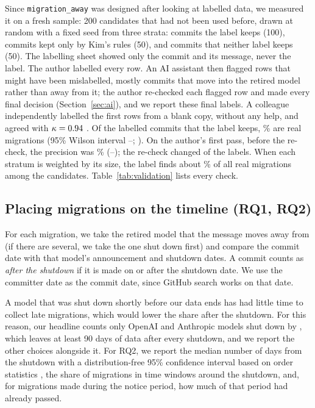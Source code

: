 Since \texttt{migration\_away} was designed after looking at labelled data, we measured it on a fresh sample: 200 candidates that had not been used before, drawn at random with a fixed seed from three strata: commits the label keeps (100), commits kept only by Kim's rules (50), and commits that neither label keeps (50). The labelling sheet showed only the commit and its message, never the label. The author labelled every row. An AI assistant then flagged rows that might have been mislabelled, mostly commits that move into the retired model rather than away from it; the author re-checked each flagged row and made every final decision (Section~\ref{sec:ai}), and we report these final labels. A colleague independently labelled the first \FilterKappaRows{} rows from a blank copy, without any help, and agreed with $\kappa = 0.94$ \citep{cohen1960}. Of the \PrecisionRows{} labelled commits that the label keeps, \Precision\% are real migrations (95\% Wilson interval \PrecisionLow--\PrecisionHigh; \citealp{wilson1927}). On the author's first pass, before the re-check, the precision was \FirstPassPrecision\% (\FirstPassPrecisionLow--\FirstPassPrecisionHigh); the re-check changed \FirstPassChanged{} of the \FirstPassRows{} labels. When each stratum is weighted by its size, the label finds about \Recall\% of all real migrations among the candidates. Table~\ref{tab:validation} lists every check.


\subsection{Placing migrations on the timeline (RQ1, RQ2)}

For each migration, we take the retired model that the message moves away from (if there are several, we take the one shut down first) and compare the commit date with that model's announcement and shutdown dates. A commit counts as \emph{after the shutdown} if it is made on or after the shutdown date. We use the committer date as the commit date, since GitHub search works on that date.

A model that was shut down shortly before our data ends has had little time to collect late migrations, which would lower the share after the shutdown. For this reason, our headline counts only OpenAI and Anthropic models shut down by \RetiredBy, which leaves at least 90 days of data after every shutdown, and we report the other choices alongside it. For RQ2, we report the median number of days from the shutdown with a distribution-free 95\% confidence interval based on order statistics \citep{conover1999}, the share of migrations in time windows around the shutdown, and, for migrations made during the notice period, how much of that period had already passed.

